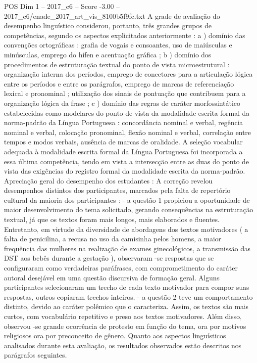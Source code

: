 \begin{textsample}{POS Dim 1 – 2017\_c6 – Score -3.00 – 2017\_c6/enade\_2017\_art\_vis\_8100b5f9fc.txt}
A grade de avaliação do desempenho linguístico considerou, portanto, três grandes grupos de competências, segundo os aspectos explicitados anteriormente : a ) domínio das convenções ortográficas : grafia de vogais e consoantes, uso de maiúsculas e minúsculas, emprego do hífen e acentuação gráfica ; b ) domínio dos procedimentos de estruturação textual do ponto de vista microestrutural : organização interna dos períodos, emprego de conectores para a articulação lógica entre os períodos e entre os parágrafos, emprego de marcas de referenciação lexical e pronominal ; utilização dos sinais de pontuação que contribuem para a organização lógica da frase ; c ) domínio das regras de caráter morfossintático estabelecidas como modelares do ponto de vista da modalidade escrita formal da norma-padrão da Língua Portuguesa : concordância nominal e verbal, regência nominal e verbal, colocação pronominal, flexão nominal e verbal, correlação entre tempos e modos verbais, ausência de marcas de oralidade.
A seleção vocabular adequada à modalidade escrita formal da Língua Portuguesa foi incorporada a essa última competência, tendo em vista a intersecção entre as duas do ponto de vista das exigências do registro formal da modalidade escrita da norma-padrão.
Apreciação geral do desempenho dos estudantes : A correção revelou desempenhos distintos dos participantes, marcados pela falta de repertório cultural da maioria dos participantes : - a questão 1 propiciou a oportunidade de maior desenvolvimento do tema solicitado, gerando consequências na estruturação textual, já que os textos foram mais longos, mais elaborados e fluentes.
Entretanto, em virtude da diversidade de abordagens dos textos motivadores ( a falta de penicilina, a recusa no uso da camisinha pelos homens, a maior frequência das mulheres na realização de exames ginecológicos, a transmissão das DST aos bebês durante a gestação ), observaram -se respostas que se configuraram como verdadeiras paráfrases, com comprometimento do caráter autoral desejável em uma questão discursiva de formação geral.
Alguns participantes selecionaram um trecho de cada texto motivador para compor suas respostas, outros copiaram trechos inteiros. - a questão 2 teve um comportamento distinto, devido ao caráter polêmico que o caracteriza.
Assim, os textos são mais curtos, com vocabulário repetitivo e preso aos textos motivadores.
Além disso, observou -se grande ocorrência de protesto em função do tema, ora por motivos religiosos ora por preconceito de gênero.
Quanto aos aspectos linguísticos analisados durante esta avaliação, os resultados observados estão descritos nos parágrafos seguintes.

\end{textsample}
